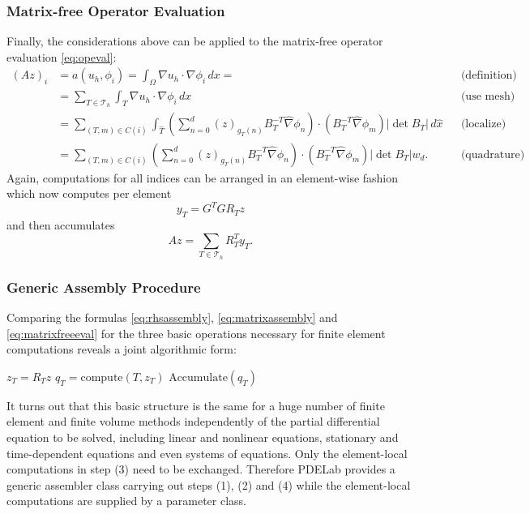 \documentclass[a4paper,12pt]{article}
\begin{document}
\subsubsection*{Matrix-free Operator Evaluation}

Finally, the considerations above can be applied to the matrix-free operator
evaluation \eqref{eq:opeval}:
\begin{align*}
(Az)_i  &= a(u_h,\phi_i) =  \int_\Omega \nabla u_h \cdot \nabla \phi_i \,dx =
&&\text{(definition)} \\ 
&= \sum_{T\in\mathcal{T}_h} \int_T \nabla u_h \cdot \nabla \phi_i \,dx
&&\text{(use mesh)}\\
&= \sum_{(T,m)\in C(i)}
\int_{\hat T} 
\left(\sum_{n=0}^d (z)_{g_T(n)} B_T^{-T} \hat\nabla\phi_n\right)
\cdot (B_T^{-T} \hat\nabla\phi_m) |\det B_T| \,d\hat x &&\text{(localize)}\\
&= \sum_{(T,m)\in C(i)}
\left(\sum_{n=0}^d (z)_{g_T(n)} B_T^{-T} \hat\nabla\phi_n\right)
\cdot (B_T^{-T} \hat\nabla\phi_m) |\det B_T| w_d . &&\text{(quadrature)}
\end{align*}
Again, computations for all indices can be arranged in an element-wise fashion
which now computes per element
\begin{equation}
y_T = G^T G R_T z
\label{eq:alpha_volume}
\end{equation}
and then accumulates
\begin{equation}
Az =  \sum_{T\in\mathcal{T}_h} R_T^T y_T.
\label{eq:matrixfreeeval}
\end{equation}

\subsubsection*{Generic Assembly Procedure}

Comparing the formulas \eqref{eq:rhsassembly}, \eqref{eq:matrixassembly}
and \eqref{eq:matrixfreeeval} for the three basic operations necessary for
finite element computations reveals a joint algorithmic form:
\begin{algorithmic}[1]
 
\State $z_T = R_T z$ 
\State $q_T=\text{compute}(T,z_T)$ 
\State $\text{Accumulate}(q_T)$ 
\EndFor
\end{algorithmic}

It turns out that this basic structure is the same for a huge number
of  finite element and finite volume methods independently of
the partial differential equation to be solved, including linear
and nonlinear equations, stationary and time-dependent equations
and even systems of equations. Only the element-local
computations in step (3) need to be exchanged. Therefore PDELab
provides a generic assembler class carrying out steps (1), (2) and (4)
while the element-local computations are supplied by a parameter class.
\end{document}
